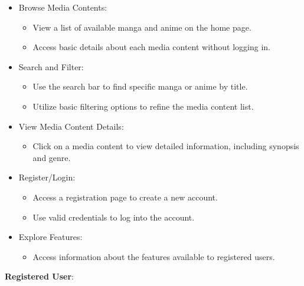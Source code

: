 \begin{itemize}
    \item Browse Media Contents:
    \begin{itemize}
        \item View a list of available manga and anime on the home page.
        \item Access basic details about each media content without logging in.
    \end{itemize}
    \item Search and Filter:
    \begin{itemize}
        \item Use the search bar to find specific manga or anime by title.
        \item Utilize basic filtering options to refine the media content list.
    \end{itemize}
    \item View Media Content Details:
    \begin{itemize}
        \item Click on a media content to view detailed information, including synopsis and genre.
    \end{itemize}
    \item Register/Login:
    \begin{itemize}
        \item Access a registration page to create a new account.
        \item Use valid credentials to log into the account.
    \end{itemize}
    \item Explore Features:
    \begin{itemize}
        \item Access information about the features available to registered users.
    \end{itemize}
\end{itemize}

\textbf{Registered User}:

